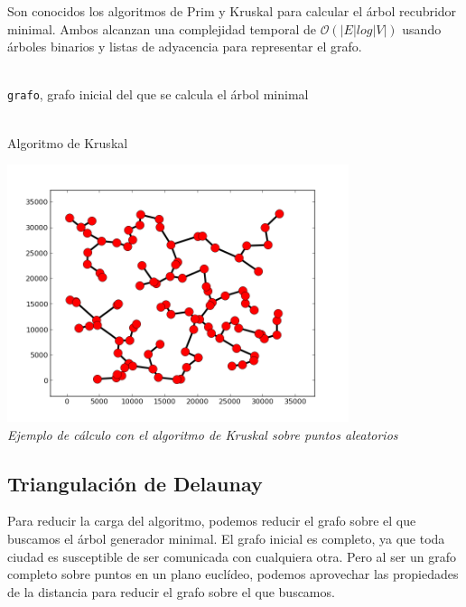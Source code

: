 \documentclass[a4paper, 11pt]{article} %
\let\emptyset\varnothing
\begin{document}
    Son conocidos los algoritmos de Prim y Kruskal para calcular el árbol recubridor minimal. Ambos alcanzan una
    complejidad temporal de $\mathcal{O}(|E|log|V|)$ usando árboles binarios y listas de adyacencia para
    representar el grafo.
    
    \begin{algorithm}[H]
	\begin{algorithmic}[1]
		\REQUIRE \ \\
        	\texttt{grafo}, grafo inicial del que se calcula el árbol minimal \\\
		\STATE{\texttt{árbol=}$\emptyset$}
		\ENDFOR
		    \ENDIF
		\ENDFOR
	\end{algorithmic}
      \caption{Algoritmo de Kruskal}
      \label{kruskal}
    \end{algorithm}

    \begin{center}
	\includegraphics[width=10cm]{figure_1.png} \\
	\textit{Ejemplo de cálculo con el algoritmo de Kruskal sobre puntos aleatorios}
     \end{center}  
    
  \subsection{Triangulación de Delaunay}
    Para reducir la carga del algoritmo, podemos reducir el grafo sobre el que buscamos el árbol generador minimal.
    El grafo inicial es completo, ya que toda ciudad es susceptible de ser comunicada con cualquiera otra. Pero al 
    ser un grafo completo sobre puntos en un plano euclídeo, podemos aprovechar las propiedades de la distancia para
    reducir el grafo sobre el que buscamos.
    
\end{document}
